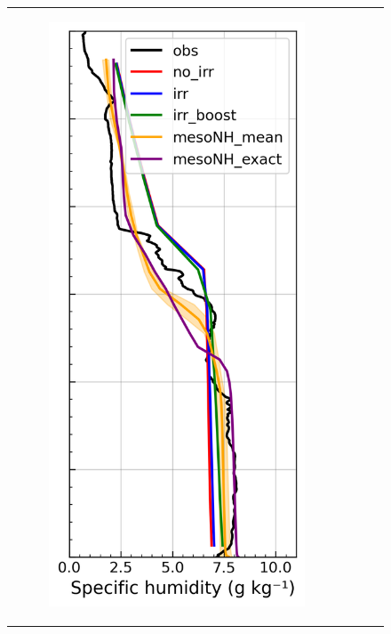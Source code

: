 \begin{figure}[hbtp]
{\begin{tabular}{@{}cccc@{}}
\begin{subfigure}[t]{0.289\textwidth}
            \includegraphics[width=\textwidth]{images/chap5/profiles/profile_elsplans_ovap_1507_.png}

\end{subfigure}
\end{tabular}}
\end{figure}
